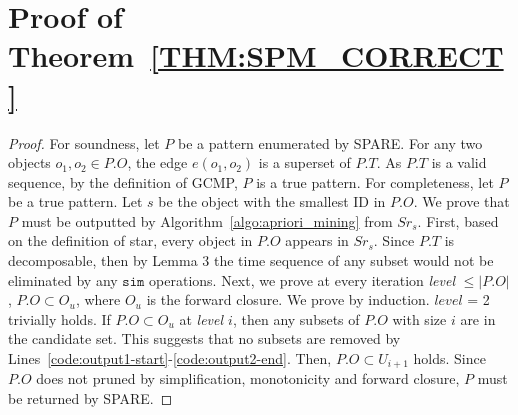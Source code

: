 \section{Proof of Theorem~\ref{THM:SPM_CORRECT}}
\label{apx:spm_correct}
\begin{proof}
For soundness, let $P$ be a pattern enumerated by SPARE. For any two objects $o_1, o_2 \in P.O$, the edge $e(o_1,o_2)$ is a superset of $P.T$. 
As $P.T$ is a valid sequence, by the definition of GCMP, $P$ is a true pattern.
For completeness, let $P$ be a true pattern. Let $s$ be the object with the smallest ID in $P.O$. We prove that $P$ must be outputted by Algorithm~\ref{algo:apriori_mining} from $Sr_s$. 
First, based on the definition of star, every object in $P.O$ appears in $Sr_s$. Since $P.T$ is decomposable, then by Lemma 3 %
the time sequence of %
any subset would not be eliminated by any $\mathtt{sim}$ operations.  Next, we prove at every iteration \emph{level} $\leq |P.O|$, $P.O \subset O_u$, where $O_u$ is the forward closure. We prove by induction. $level$ = 2 trivially holds. If $P.O \subset O_u$ at \emph{level $i$}, then any subsets of $P.O$ with size $i$ are in the candidate set. %
This suggests that no subsets are removed by Lines~\ref{code:output1-start}-\ref{code:output2-end}. Then, $P.O \subset U_{i+1}$ holds. Since $P.O$ does not pruned by simplification, monotonicity and forward closure, $P$ must be returned by SPARE.
\end{proof}
